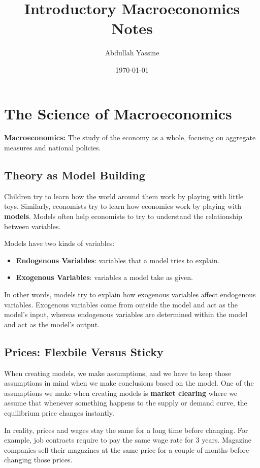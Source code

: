 \documentclass[12pt]{article}
\title{Introductory Macroeconomics Notes}
\author{Abdullah Yassine}
\date{\today}
\newcommand{\definition}[2]{
    \begin{tcolorbox}
    \textbf{#1:} #2
    \end{tcolorbox}
}
\begin{document}
\maketitle
\tableofcontents
\newpage

\section{The Science of Macroeconomics}
\definition{Macroeconomics}{The study of the economy as a whole, focusing on aggregate measures and national policies.}

\subsection{Theory as Model Building}
Children try to learn how the world around them work by playing with little toys. Similarly, economists try to learn how economies work by playing with \textbf{models}. Models often help economists to try to understand the relationship between variables.



Models have two kinds of variables:
\begin{itemize}
    \item \textbf{Endogenous Variables}: variables that a model tries to explain.
    \item \textbf{Exogenous Variables}: variables a model take as given.
\end{itemize}


In other words, models try to explain how exogenous variables affect endogenous variables. Exogenous variables come from outside the model and act as the model's input, whereas endogenous variables are determined within the model and act as the model's output.



\subsection{Prices: Flexbile Versus Sticky}

When creating models, we make assumptions, and we have to keep those assumptions in mind when we make conclusions based on the model. One of the assumptions we make when creating models is \textbf{market clearing} where we assume that whenever something happens to the supply or demand curve, the equilibrium price changes instantly.


In reality, prices and wages stay the same for a long time before changing. For example, job contracts require to pay the same wage rate for 3 years. Magazine companies sell their magazines at the same price for a couple of months before changing those prices.
\end{document}
